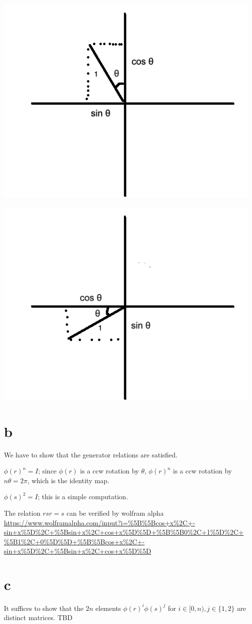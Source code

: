 \documentclass{article}
\begin{document}
\includegraphics[scale=0.65]{basis1.png}

\includegraphics[scale=0.65]{basis2.png}

\section*{b}

We have to show that the generator relations are satisfied.

$\phi(r)^n = I$; since $\phi(r)$ is a ccw rotation by $\theta$, $\phi(r)^n$ is a ccw rotation by $n\theta = 2\pi$, which is the identity map.

$\phi(s)^2 = I$; this is a simple computation.

The relation $rsr = s$ can be verified by wolfram alpha \url{https://www.wolframalpha.com/input?i=%5B%5Bcos+x%2C+-sin+x%5D%2C+%5Bsin+x%2C+cos+x%5D%5D+%5B%5B0%2C+1%5D%2C+%5B1%2C+0%5D%5D+%5B%5Bcos+x%2C+-sin+x%5D%2C+%5Bsin+x%2C+cos+x%5D%5D}

\section*{c}

It suffices to show that the $2n$ elements $\phi(r)^i \phi(s)^j$ for $i \in [0, n), j \in \{1, 2\}$ are distinct matrices. TBD
\end{document}
